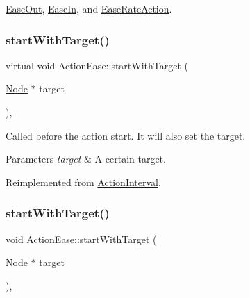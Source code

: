 \hyperlink{classEaseOut_a6ad7b6fdd15cf8c5f1c3ad325c384f51}{Ease\+Out}, \hyperlink{classEaseIn_adc23609d0a863b45012b4b6361178728}{Ease\+In}, and \hyperlink{classEaseRateAction_acd2b87a3358e01fa74a726634dcd41fb}{Ease\+Rate\+Action}.

\mbox{\label{classActionEase_a2b1a6fe2d83fe96723ca32c30301fda5}} 
\subsubsection{\texorpdfstring{start\+With\+Target()}{startWithTarget()}\hspace{0.1cm}{\footnotesize\ttfamily [1/2]}}
{\footnotesize\ttfamily virtual void Action\+Ease\+::start\+With\+Target (\begin{DoxyParamCaption}\item[{\hyperlink{classNode}{Node} $\ast$}]{target }\end{DoxyParamCaption})\hspace{0.3cm}{\ttfamily [override]}, {\ttfamily [virtual]}}

Called before the action start. It will also set the target.


\begin{DoxyParams}{Parameters}
{\em target} & A certain target. \\
\hline
\end{DoxyParams}


Reimplemented from \hyperlink{classActionInterval_ad3d91186b2c3108488ddbbdbbd982484}{Action\+Interval}.

\mbox{\label{classActionEase_a04976f42219b97e850043ab9cd182918}} 
\subsubsection{\texorpdfstring{start\+With\+Target()}{startWithTarget()}\hspace{0.1cm}{\footnotesize\ttfamily [2/2]}}
{\footnotesize\ttfamily void Action\+Ease\+::start\+With\+Target (\begin{DoxyParamCaption}\item[{\hyperlink{classNode}{Node} $\ast$}]{target }\end{DoxyParamCaption})\hspace{0.3cm}{\ttfamily [override]}, {\ttfamily [virtual]}}

